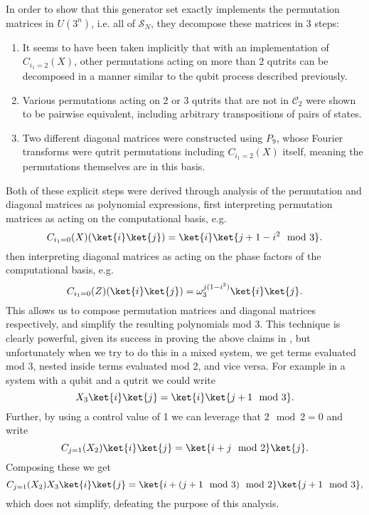 In order to show that this generator set exactly implements the permutation matrices in $U\left(3^n\right)$, i.e. all of $\mathcal{S}_{N}$, they decompose these matrices in 3 steps:
\begin{enumerate}
	\item It seems to have been taken implicitly that with an implementation of $C_{i_1 = 2}(X)$, other permutations acting on more than 2 qutrits can be decomposed in a manner similar to the qubit process described previously.
	\item Various permutations acting on 2 or 3 qutrits that are not in $\mathcal{C}_2$ were shown to be pairwise equivalent, including arbitrary transpositions of pairs of states.
	\item Two different diagonal matrices were constructed using $P_9$, whose Fourier transforms were qutrit permutations including $C_{i_1=2}(X)$ itself, meaning the permutations themselves are in this basis.
\end{enumerate}

Both of these explicit steps were derived through analysis of the permutation and diagonal matrices as polynomial expressions, first interpreting permutation matrices as acting on the computational basis, e.g.
\[C_{i_1=0}(X)(\ket{i}\ket{j}) = \ket{i}\ket{j+1-i^2 \mod 3}.\]
then interpreting diagonal matrices as acting on the phase factors of the computational basis, e.g.
\[C_{i_1=0}(Z)(\ket{i}\ket{j}) = \omega_{3}^{j(1-i^2)}\ket{i}\ket{j}.\]
This allows us to compose permutation matrices and diagonal matrices respectively, and simplify the resulting polynomials mod 3. This technique is clearly powerful, given its success in proving the above claims in \cite{arithmetics}, but unfortunately when we try to do this in a mixed system, we get terms evaluated mod 3, nested inside terms evaluated mod 2, and vice versa. For example in a system with a qubit and a qutrit we could write
\[X_3\ket{i}\ket{j} = \ket{i}\ket{j+1\mod 3}.\]
Further, by using a control value of 1 we can leverage that $2 \mod 2 = 0$ and write
\[C_{j=1}(X_2)\ket{i}\ket{j} = \ket{i+j \mod 2}\ket{j}.\]
Composing these we get
\[C_{j=1}(X_2)X_3\ket{i}\ket{j} = \ket{i+(j+1 \mod 3)\mod 2}\ket{j + 1 \mod 3},\]
which does not simplify, defeating the purpose of this analysis. 

